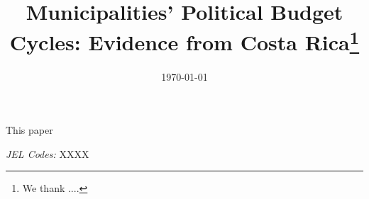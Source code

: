 \documentclass[12pt,a4paper]{article}
\title{\huge{Municipalities' Political Budget Cycles: Evidence from Costa Rica}\thanks{\footnotesize We thank ....}}
\author{\large \vspace{0.5cm} André Campos,\thanks{School of Economics and School of Political Sciences. University of Costa Rica Email: \href{mailto:andre.camposreyes@ucr.ac.cr}{andre.camposreyes@ucr.ac.cr}}
	\text{ Augusto del Solar}\thanks{School of Economics. University of Costa Rica Email: \href{mailto:augusto.delsolar@ucr.ac.cr}{augusto.delsolar@ucr.ac.cr}}
	\text{ and José I. González-Rojas, }\thanks School of Economics. University of Costa Rica Email: \href{mailto:joseignacio.gonzalez@ucr.ac.cr}{joseignacio.gonzalez@ucr.ac.cr}}
\date{\today}
\begin{document}
	\onehalfspacing
	\setlength{\parindent}{1cm}
	\clearpage\maketitle
	\thispagestyle{empty}
	\setcounter{page}{0}
	\maketitle
	
	\begin{small}
		\onehalfspacing
		\vspace{0.75cm}
		This paper 
		\vspace{20pt}
		
		\textit{JEL Codes:} XXXX
	\end{small}
	\newpage
	\setcounter{page}{1}
	


	
\end{document}
